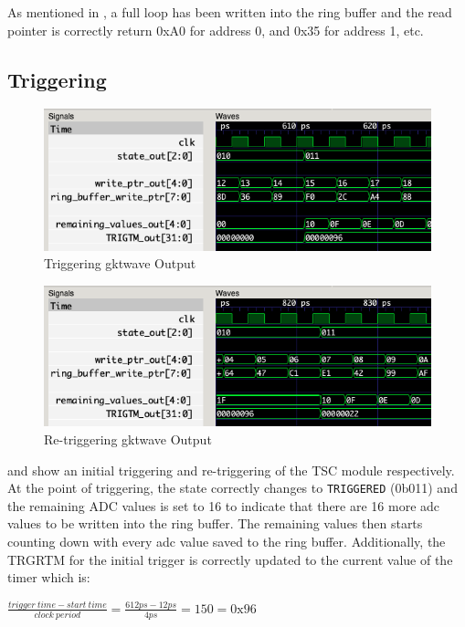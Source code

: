 As mentioned in , a full loop has been written into the ring buffer and the read pointer is correctly return 0xA0 for address 0, and 0x35 for address 1, etc.

\subsection{Triggering}
\begin{figure}[H]
    \centering
    \includegraphics[width=\columnwidth]{Figures/Dtriggered}
    \caption{Triggering gktwave Output}
    \label{fig:testD}
\end{figure}
\begin{figure}[H]
    \centering
    \includegraphics[width=\columnwidth]{Figures/Dtriggered2}
    \caption{Re-triggering gktwave Output}
    \label{fig:testD2}
\end{figure}

 and  show an initial triggering and re-triggering of the TSC module respectively.
At the point of triggering, the state correctly changes to \texttt{TRIGGERED} (0b011) and the remaining ADC values is set to 16 to indicate that there are 16 more adc values to be written into the ring buffer.
The remaining values then starts counting down with every adc value saved to the ring buffer.
Additionally, the TRGRTM for the initial trigger is correctly updated to the current value of the timer which is:

$\frac{trigger\ time - start\ time}{clock\ period} = \frac{612ps - 12ps }{4ps} = 150 = \mathrm{0x96}$

